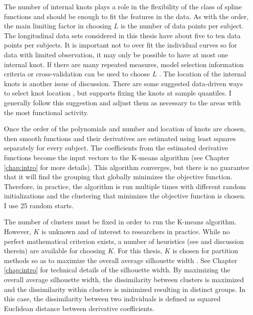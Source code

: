 The number of internal knots plays a role in the flexibility of the class of spline functions and should be enough to fit the features in the data. As with the order, the main limiting factor in choosing $L$ is the number of data points per subject. The longitudinal data sets considered in this thesis have about five to ten data points per subjects. It is important not to over fit the individual curves so for data with limited observation, it may only be possible to have at most one internal knot. If there are many repeated measures, model selection information criteria or cross-validation can be used to choose $L$ \cite{rice2001}. The location of the internal knots is another issue of discussion. There are some suggested data-driven ways to select knot location \cite{shanggang2001}, but \textcite{ruppert2002} supports fixing the knots at sample quantiles. I generally follow this suggestion and adjust them as necessary to the areas with the most functional activity. 

Once the order of the polynomials and number and location of knots are chosen, then smooth functions and their derivatives are estimated using least squares separately for every subject. The coefficients from the estimated derivative functions become the input vectors to the K-means algorithm (see Chapter \ref{chap:intro} for more details). This algorithm converges, but there is no guarantee that it will find the grouping that globally minimizes the objective function. Therefore, in practice, the algorithm is run multiple times with different random initializations and the clustering that minimizes the objective function is chosen. I use 25 random starts.

The number of clusters must be fixed in order to run the K-means algorithm. However, $K$ is unknown and of interest to researchers in practice. While no perfect mathematical criterion exists, a number of heuristics (see \cite{tibshirani2001} and discussion therein) are available for choosing $K$. For this thesis, $K$ is chosen for partition methods so as to maximize the overall average silhouette width \cite{rousseeuw1987}. See Chapter \ref{chap:intro} for technical details of the silhouette width. By maximizing the overall average silhouette width, the dissimilarity between clusters is maximized and the dissimilarity within clusters is minimized resulting in distinct groups. In this case, the dissimilarity between two individuals is defined as squared Euclidean distance between derivative coefficients.

